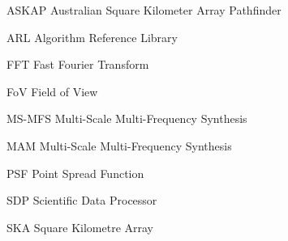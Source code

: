 \documentclass[11pt,a4paper,variablewidth]{article}
\begin{document}
\tccfrontpage

\sdptableofcontents

\sdplistofabbreviations
\begin{basedescript}{\desclabelstyle{\pushlabel}\desclabelwidth{6em}}
    \item[ASKAP] Australian Square Kilometer Array Pathfinder\vspace{-0.2cm}
    \item[ARL] Algorithm Reference Library\vspace{-0.2cm}
    \item[FFT] Fast Fourier Transform\vspace{-0.2cm}
    \item[FoV] Field of View\vspace{-0.2cm}
    \item[MS-MFS] Multi-Scale Multi-Frequency Synthesis\vspace{-0.2cm}
    \item[MAM] Multi-Scale Multi-Frequency Synthesis\vspace{-0.2cm}
    \item[PSF] Point Spread Function \vspace{-0.2cm}
    \item[SDP] Scientific Data Processor\vspace{-0.2cm}
    \item[SKA] Square Kilometre Array\vspace{-0.2cm}
\end{basedescript} 

\newcommand{\nuno}{{\left(\frac{\nu}{\nu_0}\right)}}
\newcommand{\dnuno}{{\left(\frac{\nu-\nu_0}{\nu_0}\right)}}

\newcommand{\dg}{^\dag}
\newcommand{\X}{\vec{x}}
\newcommand{\Xd}{\vec{{x}^\dag}}
\newcommand{\B}{\vec{b}}
\newcommand{\Bd}{\vec{b^\dag}}
\newcommand{\V}{\vec{V}}
\newcommand{\Vd}{\vec{V^\dag}}
\newcommand{\A}{{\tens{A}{}}}
\newcommand{\Ad}{{\tens{A^\dag}{}}}
\newcommand{\F}{{\tens{F}{s}}}
\newcommand{\Fd}{{\tens{F^\dag}{}}}
\newcommand{\He}{{\tens{H}{}}}
\newcommand{\Sa}{{\tens{S}{}}}
\newcommand{\Sd}{{\tens{S^\dag}{}}}
\newcommand{\Sna}{\tens{{S_{\nu}}{}}}
\newcommand{\Snd}{\tens{{S_{\nu}^\dag}{}}}
\newcommand{\T}{{\tens{T}{}}}
\newcommand{\W}{{\tens{W}{}}}
\newcommand{\Wd}{{\tens{W^\dag}{}}}
\newcommand{\Pb}{{\vec{P}}}
\end{document}
